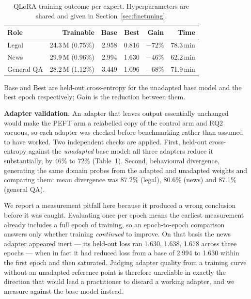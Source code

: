 \documentclass[journal,10pt,compsoc,onecolumn]{IEEEtran}
\begin{document}
\begin{table}[t]
\centering
\caption{QLoRA training outcome per expert. Hyperparameters are shared and given
in Section~\ref{sec:finetuning}.}
\label{tab:finetuning}
\small
\begin{tabular}{lrrrrr}
\toprule
\textbf{Role} & \textbf{Trainable} & \textbf{Base} & \textbf{Best} & \textbf{Gain} & \textbf{Time} \\
\midrule
Legal      & 24.3\,M (0.75\%) & 2.958 & 0.816 & $-72\%$ & 78.3\,min \\
News       & 29.9\,M (0.96\%) & 2.994 & 1.630 & $-46\%$ & 62.2\,min \\
General QA & 28.2\,M (1.12\%) & 3.449 & 1.096 & $-68\%$ & 71.9\,min \\
\bottomrule
\end{tabular}

\vspace{2pt}
{\footnotesize Base and Best are held-out cross-entropy for the unadapted base
model and the best epoch respectively; Gain is the reduction between them.}
\end{table}

\textbf{Adapter validation.} An adapter that leaves output essentially unchanged
would make the PEFT arm a relabelled copy of the control arm and RQ2 vacuous, so
each adapter was checked before benchmarking rather than assumed to have worked.
Two independent checks are applied. First, held-out cross-entropy against the
\emph{unadapted} base model: all three adapters reduce it substantially, by 46\%
to 72\% (Table~\ref{tab:finetuning}). Second, behavioural divergence, generating
the same domain probes from the adapted and unadapted weights and comparing them:
mean divergence was 87.2\% (legal), 80.6\% (news) and 87.1\% (general QA).

We report a measurement pitfall here because it produced a wrong conclusion
before it was caught. Evaluating once per epoch means the earliest measurement
already includes a full epoch of training, so an epoch-to-epoch comparison
answers only whether training \emph{continued} to improve. On that basis the news
adapter appeared inert --- its held-out loss ran 1.630, 1.638, 1.678 across three
epochs --- when in fact it had reduced loss from a base of 2.994 to 1.630 within
the first epoch and then saturated. Judging adapter quality from a training curve
without an unadapted reference point is therefore unreliable in exactly the
direction that would lead a practitioner to discard a working adapter, and we
measure against the base model instead.
\end{document}
